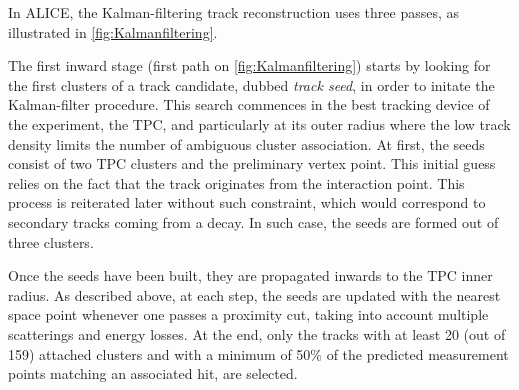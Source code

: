 In ALICE, the Kalman-filtering track reconstruction uses three passes, as illustrated in \fig\ref{fig:Kalmanfiltering}. 

The first inward stage (first path on \fig\ref{fig:Kalmanfiltering}) starts by looking for the first clusters of a track candidate, dubbed \textit{track seed}, in order to initate the Kalman-filter procedure. This search commences in the best tracking device of the experiment, \ie the TPC, and particularly at its outer radius where the low track density limits the number of ambiguous cluster association. At first, the seeds consist of two TPC clusters and the preliminary vertex point. This initial guess relies on the fact that the track originates from the interaction point. This process is reiterated later without such constraint, which would correspond to secondary tracks coming from a decay. In such case, the seeds are formed out of three clusters.

Once the seeds have been built, they are propagated inwards to the TPC inner radius.
As described above, at each step, the seeds are updated with the nearest space point whenever one passes a proximity cut, taking into account multiple scatterings and energy losses. At the end, only the tracks with at least 20 (out of 159) attached clusters and with a minimum of 50\% of the predicted measurement points matching an associated hit, are selected. 

